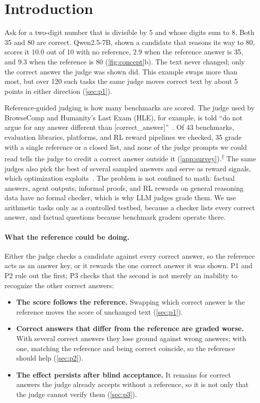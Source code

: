 \documentclass{article}
\newcommand{\ph}{\textsuperscript{$\dagger$}}
\begin{document}
\section{Introduction}
\label{sec:intro}

Ask for a two-digit number that is divisible by 5 and whose digits sum to 8.
Both 35 and 80 are correct.
Qwen2.5-7B, shown a candidate that reasons its way to 80, scores it 10.0 out of 10 with no reference, 2.9 when the reference answer is 35, and 9.3 when the reference is 80 (\cref{fig:concept}b).
The text never changed; only the correct answer the judge was shown did.
This example swaps more than most, but over 120 such tasks the same judge moves correct text by about 5 points in either direction (\cref{sec:p1}).

Reference-guided judging is how many benchmarks are scored.
The judge used by BrowseComp and Humanity's Last Exam (HLE), for example, is told ``do not argue for any answer different than [correct\_answer]''~\citep{wei2025browsecomp,phan2025hle}.
Of 43 benchmarks, evaluation libraries, platforms, and RL reward pipelines we checked, 35 grade with a single reference or a closed list, and none of the judge prompts we could read tells the judge to credit a correct answer outside it (\cref{app:survey}).\ph{}
The same judges also pick the best of several sampled answers and serve as reward signals, which optimization exploits~\citep{gao2022scaling}.
The problem is not confined to math: factual answers, agent outputs, informal proofs, and RL rewards on general reasoning data have no formal checker, which is why LLM judges grade them. We use arithmetic tasks only as a controlled testbed, because a checker lists every correct answer, and factual questions because benchmark graders operate there.

\paragraph{What the reference could be doing.}
Either the judge checks a candidate against every correct answer, so the reference acts as an answer key, or it rewards the one correct answer it was shown.
P1 and P2 rule out the first; P3 checks that the second is not merely an inability to recognize the other correct answers:
\begin{itemize}[leftmargin=1.5em,itemsep=2pt,topsep=2pt]
\item[\textbf{P1}] \textbf{The score follows the reference.} Swapping which correct answer is the reference moves the score of unchanged text (\cref{sec:p1}).
\item[\textbf{P2}] \textbf{Correct answers that differ from the reference are graded worse.} With several correct answers they lose ground against wrong answers; with one, matching the reference and being correct coincide, so the reference should help (\cref{sec:p2}).
\item[\textbf{P3}] \textbf{The effect persists after blind acceptance.} It remains for correct answers the judge already accepts without a reference, so it is not only that the judge cannot verify them (\cref{sec:p3}).
\end{itemize}
\end{document}
